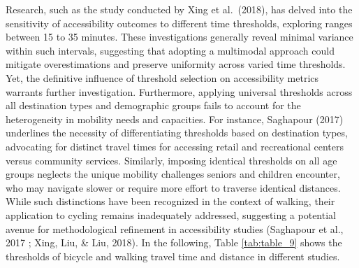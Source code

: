 \documentclass[
11pt, %
oneside, %
english, %
singlespacing, %
]{macthesis} %
\begin{document}
Research, such as the study conducted by Xing et al.~(2018), has delved into the sensitivity of accessibility outcomes to different time thresholds, exploring ranges between 15 to 35 minutes. These investigations generally reveal minimal variance within such intervals, suggesting that adopting a multimodal approach could mitigate overestimations and preserve uniformity across varied time thresholds. Yet, the definitive influence of threshold selection on accessibility metrics warrants further investigation. Furthermore, applying universal thresholds across all destination types and demographic groups fails to account for the heterogeneity in mobility needs and capacities. For instance, Saghapour (2017) underlines the necessity of differentiating thresholds based on destination types, advocating for distinct travel times for accessing retail and recreational centers versus community services. Similarly, imposing identical thresholds on all age groups neglects the unique mobility challenges seniors and children encounter, who may navigate slower or require more effort to traverse identical distances. While such distinctions have been recognized in the context of walking, their application to cycling remains inadequately addressed, suggesting a potential avenue for methodological refinement in accessibility studies (Saghapour et al., 2017 ; Xing, Liu, \& Liu, 2018). In the following, Table \ref{tab:table_9} shows the thresholds of bicycle and walking travel time and distance in different studies.
\end{document}
